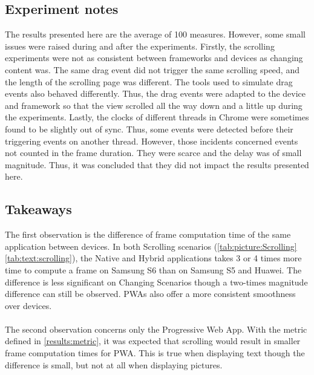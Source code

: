 \documentclass{kththesis}
\begin{document}
\subsection{Experiment notes}
The results presented here are the average of 100 measures. However, some small issues were raised during and after the experiments.\newline
Firstly, the scrolling experiments were not as consistent between frameworks and devices as changing content was. The same drag event did not trigger the same scrolling speed, and the length of the scrolling page was different. The tools used to simulate drag events also behaved  differently. Thus, the drag events were adapted to the device and framework so that the view scrolled all the way down and a little up during the experiments. \newline
Lastly, the clocks of different threads in Chrome were sometimes found to be slightly out of sync. Thus, some events were detected before their triggering events on another thread. However, those incidents concerned events not counted in the frame duration. They were scarce and the delay was of small magnitude. Thus, it was concluded that they did not impact the results presented here.

\subsection{Takeaways}
\label{results:performance}
The first observation is the difference of frame computation time of the same application between devices. In both Scrolling scenarios (\autoref{tab:picture:Scrolling} \autoref{tab:text:scrolling}), the Native and Hybrid applications takes 3 or 4 times more time to compute a frame on Samsung S6 than on Samsung S5 and Huawei. The difference is less significant on Changing Scenarios though a two-times magnitude difference can still be observed. PWAs also offer a more consistent smoothness over devices.
\paragraph{}
The second observation concerns only the Progressive Web App. With the metric defined in \autoref{results:metric}, it was expected that scrolling would result in smaller frame computation times for PWA. This is true when displaying text though the difference is small, but not at all when displaying pictures. 
\end{document}
